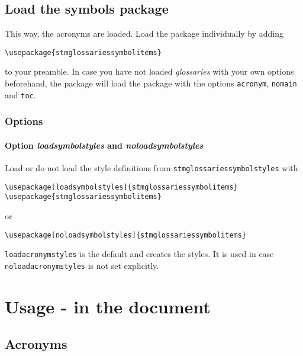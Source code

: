 \documentclass{scrartcl}
\begin{document}
\subsection{Load the symbols package}
\label{sec:usage:preamble:symbolspackage}

This way, the acronyms are loaded. Load the package individually by adding

\begin{verbatim}
\usepackage{stmglossariessymbolitems}
\end{verbatim}

to your preamble. In case you have not loaded \textit{glossaries} with your own options beforehand, the package will load the package with the options \texttt{acronym}, \texttt{nomain} and \texttt{toc}.

\subsubsection{Options}

\paragraph{Option \protect\textit{loadsymbolstyles} and \protect\textit{noloadsymbolstyles}}

Load or do not load the style definitions from \texttt{stmglossariessymbolstyles} with

\begin{verbatim}
\usepackage[loadsymbolstyles]{stmglossariessymbolitems}
\usepackage{stmglossariessymbolitems}
\end{verbatim}

or

\begin{verbatim}
\usepackage[noloadsymbolstyles]{stmglossariessymbolitems}
\end{verbatim}

\texttt{loadacronymstyles} is the default and creates the styles. It is used in case \texttt{noloadacronymstyles} is not set explicitly.


\section{Usage - in the document}
\label{sec:usage:document}

\subsection{Acronyms}
\label{sec:usage:document:acronyms}
\end{document}
